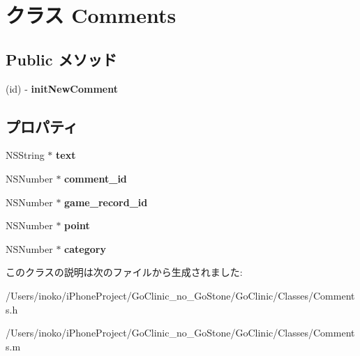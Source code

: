 \hypertarget{interface_comments}{
\section{クラス Comments}
\label{interface_comments}
}
\subsection*{Public メソッド}
\begin{DoxyCompactItemize}
\item 
\hypertarget{interface_comments_a25786b2cc2e363a9fe58e36ca8fbc50c}{
(id) -\/ {\bfseries initNewComment}}
\label{interface_comments_a25786b2cc2e363a9fe58e36ca8fbc50c}

\end{DoxyCompactItemize}
\subsection*{プロパティ}
\begin{DoxyCompactItemize}
\item 
\hypertarget{interface_comments_aa8826e1d0c33addc49356e37eff0f1d2}{
NSString $\ast$ {\bfseries text}}
\label{interface_comments_aa8826e1d0c33addc49356e37eff0f1d2}

\item 
\hypertarget{interface_comments_add340d3fb7491633ae5793e190350538}{
NSNumber $\ast$ {\bfseries comment\_\-id}}
\label{interface_comments_add340d3fb7491633ae5793e190350538}

\item 
\hypertarget{interface_comments_a443b63138c11f2a5c1cc88010bb0decf}{
NSNumber $\ast$ {\bfseries game\_\-record\_\-id}}
\label{interface_comments_a443b63138c11f2a5c1cc88010bb0decf}

\item 
\hypertarget{interface_comments_a791451d841ae6eb605b00d86fff418a2}{
NSNumber $\ast$ {\bfseries point}}
\label{interface_comments_a791451d841ae6eb605b00d86fff418a2}

\item 
\hypertarget{interface_comments_a1d5c475bf3aab8b33eea6c2eb6e0e10c}{
NSNumber $\ast$ {\bfseries category}}
\label{interface_comments_a1d5c475bf3aab8b33eea6c2eb6e0e10c}

\end{DoxyCompactItemize}


このクラスの説明は次のファイルから生成されました:\begin{DoxyCompactItemize}
\item 
/Users/inoko/iPhoneProject/GoClinic\_\-no\_\-GoStone/GoClinic/Classes/Comments.h\item 
/Users/inoko/iPhoneProject/GoClinic\_\-no\_\-GoStone/GoClinic/Classes/Comments.m\end{DoxyCompactItemize}
